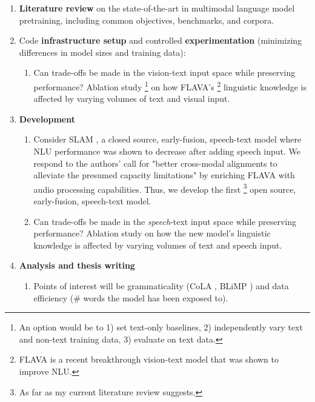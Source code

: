 \documentclass{article}
\begin{document}
\begin{enumerate}
    \item \textbf{Literature review} on the state-of-the-art in multimodal language model pretraining, including common objectives, benchmarks, and corpora. 
    \item Code \textbf{infrastructure setup} and controlled \textbf{experimentation} (minimizing differences in model sizes and training data):
    \begin{enumerate}
        \item Can trade-offs be made in the vision-text input space while preserving performance? Ablation study \footnote{An option would be to 1) set text-only baselines, 2) independently vary text and non-text training data, 3) evaluate on text data.} on how FLAVA's \footnote{FLAVA is a recent breakthrough \cite{BrownStudy, AlexThesis} vision-text model that was shown to improve NLU.} linguistic knowledge is affected by varying volumes of text and visual input. %
    \end{enumerate}
    \item \textbf{Development} 
   \begin{enumerate}
        \item Consider SLAM \cite{SLAM}, a closed source, early-fusion, speech-text model where NLU performance was shown to decrease after adding speech input. We respond to the authors' call for "better cross-modal alignments to alleviate the presumed capacity limitations" by enriching FLAVA with audio processing capabilities. Thus, we develop the first \footnote{As far as my current literature review suggests.} open source, early-fusion, speech-text model. %
        \item Can trade-offs be made in the \textit{speech}-text input space while preserving performance? Ablation study on how the new model's linguistic knowledge is affected by varying volumes of text and speech input.
    \end{enumerate}
    \item \textbf{Analysis and thesis writing} 
       \begin{enumerate}
         \item Points of interest will be grammaticality (CoLA \cite{CoLA}, BLiMP \cite{BLiMP}) and data efficiency (\# words the model has been exposed to).
       \end{enumerate}
\end{enumerate}
\end{document}
